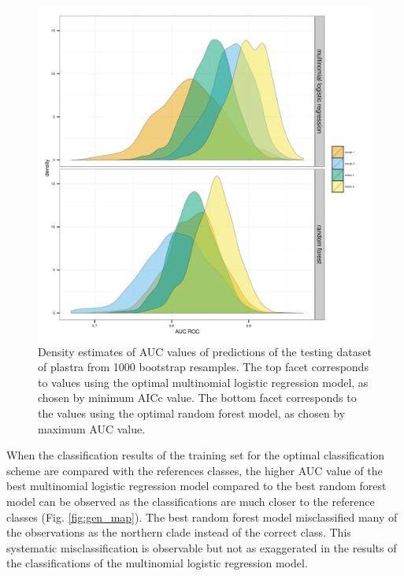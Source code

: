 \documentclass[12pt,letterpaper]{article}\usepackage{graphicx, color}
\begin{document}
\begin{figure}[ht]
  \centering
  \includegraphics[width = \textwidth]{figure/gen_res}
  \caption{Density estimates of AUC values of predictions of the testing dataset of plastra from 1000 bootstrap resamples. The top facet corresponds to values using the optimal multinomial logistic regression model, as chosen by minimum AICc value. The bottom facet corresponds to the values using the optimal random forest model, as chosen by maximum AUC value.}
  \label{fig:gen_res}
\end{figure}

When the classification results of the training set for the optimal classification scheme are compared with the references classes, the higher AUC value of the best multinomial logistic regression model compared to the best random forest model can be observed as the classifications are much closer to the reference classes (Fig. \ref{fig:gen_map}). The best random forest model misclassified many of the observations as the northern clade instead of the correct class. This systematic misclassification is observable but not as exaggerated in the results of the classifications of the multinomial logistic regression model.
\end{document}
